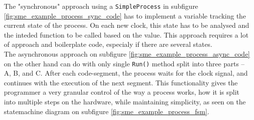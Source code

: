The "synchronous" approach using a \texttt{SimpleProcess} in subfigure
\ref{fig:sme_example_process_sync_code}
has to implement a
variable tracking the current state of the process. On each new clock, this
state has to be analysed and the inteded function to be called based on the
value. This approach requires a lot of approach and boilerplate code, especialy
if there are several states.\\
The asynchronous approach on subfigure
\ref{fig:sme_example_process_async_code}
on the other hand can do with only
single \texttt{Run()} method split into three parts -- A, B, and C.
After each code-segment, the process waits for the clock signal, and
continues with the execution of the next segment.  This functionality
gives the programmer a very granular control of the way a process
works, how it is split into multiple steps on the hardware, while
maintaining simplicity, as seen on the statemachine diagram on subfigure
\ref{fig:sme_example_process_fsm}.

